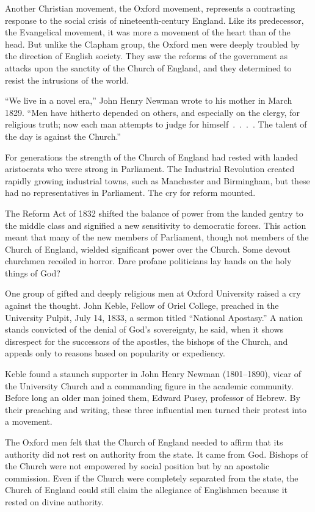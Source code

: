 Another Christian movement, the Oxford movement, represents a contrasting response to the social
crisis of nineteenth-century England. Like its predecessor, the Evangelical movement, it was more a
movement of the heart than of the head. But unlike the Clapham group, the Oxford men were deeply
troubled by the direction of English society. They saw the reforms of the government as attacks upon
the sanctity of the Church of England, and they determined to resist the intrusions of the world.

“We live in a novel era,” John Henry Newman wrote to his mother in March 1829. “Men have hitherto
depended on others, and especially on the clergy, for religious truth; now each man attempts to
judge for himself~.~.~.~. The talent of the day is against the Church.”

For generations the strength of the Church of England had rested with landed aristocrats who were
strong in Parliament. The Industrial Revolution created rapidly growing industrial towns, such as
Manchester and Birmingham, but these had no representatives in Parliament. The cry for reform
mounted.

The Reform Act of 1832 shifted the balance of power from the landed gentry to the middle class and
signified a new sensitivity to democratic forces. This action meant that many of the new members of
Parliament, though not members of the Church of England, wielded significant power over the Church.
Some devout churchmen recoiled in horror. Dare profane politicians lay hands on the holy things of
God?

One group of gifted and deeply religious men at Oxford University raised a cry against the thought.
John Keble, Fellow of Oriel College, preached in the University Pulpit, July 14, 1833, a sermon
titled “National Apostasy.” A nation stands convicted of the denial of God’s sovereignty, he said,
when it shows disrespect for the successors of the apostles, the bishops of the Church, and appeals
only to reasons based on popularity or expediency.

Keble found a staunch supporter in John Henry Newman (1801–1890), vicar of the University Church and
a commanding figure in the academic community. Before long an older man joined them, Edward Pusey,
professor of Hebrew. By their preaching and writing, these three influential men turned their
protest into a movement.

The Oxford men felt that the Church of England needed to affirm that its authority did not rest on
authority from the state. It came from God. Bishops of the Church were not empowered by social
position but by an apostolic commission. Even if the Church were completely separated from the
state, the Church of England could still claim the allegiance of Englishmen because it rested on
divine authority.

